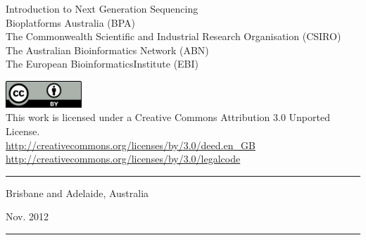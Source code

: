 \documentclass[a4paper,12pt]{article}
\title{\workshopTitle}
\date{\workshopDate}
\author{\workshopAuthor}
\newcommand{\workshopTitle}{Introduction to Next Generation Sequencing}
\newcommand{\workshopVenue}{Brisbane and Adelaide, Australia}
\newcommand{\workshopDate}{Nov. 2012}
\newcommand{\workshopAuthor}{
Bioplatforms Australia (BPA)\\
The Commonwealth Scientific and Industrial Research Organisation (CSIRO)\\
The Australian Bioinformatics Network (ABN)\\
The European BioinformaticsInstitute (EBI)
}
\begin{document}
%
%
\noindent

\begin{center}
\vspace*{\fill}
{\huge\workshopTitle}\\[1cm]
\workshopAuthor

\vfill
%

\includegraphics[height=1cm]{./licences/cc_by.png}\\
This work is licensed under a Creative Commons Attribution 3.0 Unported License.\\
\url{http://creativecommons.org/licenses/by/3.0/deed.en_GB}\\
\url{http://creativecommons.org/licenses/by/3.0/legalcode}\\


\vfill

\rule{\textwidth}{1pt}
\begin{minipage}{0.45\textwidth}
\begin{flushleft}
\workshopVenue
\end{flushleft}
\end{minipage}
\begin{minipage}{0.45\textwidth}
\begin{flushright}
\workshopDate
\end{flushright}
\end{minipage}

\rule{\textwidth}{1pt}
\end{center}

\clearpage


%
%

\clearpage

%
%

\end{document}
